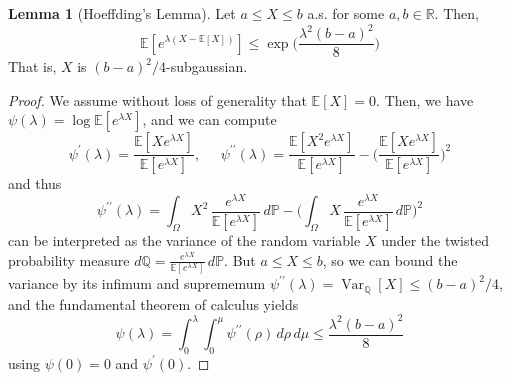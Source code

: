 \documentclass{article}
\DeclareMathOperator{\Var}{Var}
\theoremstyle{definition}
\newtheorem{lemma}[theorem]{Lemma}
\theoremstyle{remark}
\theoremstyle{definition}
\begin{document}
  \begin{lemma}[Hoeffding's Lemma]
  Let $a \leq X \leq b$ a.s. for some $a, b \in \mathbb{R}$. Then, 
  \[\mathbb{E}[e^{\lambda(X - \mathbb{E}[X])}] \leq \exp \bigg( \frac{\lambda^2 (b - a)^2}{8} \bigg)\]
  That is, $X$ is $(b-a)^2 /4$-subgaussian. 
  \end{lemma}
  \begin{proof}
  We assume without loss of generality that $\mathbb{E}[X] = 0$. Then, we have $\psi(\lambda) = \log \mathbb{E}[ e^{\lambda X}]$, and we can compute 
  \[\psi^\prime (\lambda) = \frac{\mathbb{E}[X e^{\lambda X}]}{\mathbb{E}[e^{\lambda X}]}, \;\;\;\;\; \psi^{\prime\prime} (\lambda) = \frac{\mathbb{E}[X^2 e^{\lambda X}]}{\mathbb{E}[e^{\lambda X}]} - \bigg( \frac{\mathbb{E}[X e^{\lambda X}]}{\mathbb{E}[e^{\lambda X}]} \bigg)^2\]
  and thus 
  \[\psi^{\prime\prime} (\lambda) = \int_\Omega X^2 \, \frac{e^{\lambda X}}{\mathbb{E}[e^{\lambda X}]} \,d\mathbb{P} - \bigg( \int_\Omega X \, \frac{e^{\lambda X}}{\mathbb{E}[e^{\lambda X}]} \,d\mathbb{P} \bigg)^2 \] 
  can be interpreted as the variance of the random variable $X$ under the twisted probability measure $d\mathbb{Q} = \frac{e^{\lambda X}}{\mathbb{E}[e^{\lambda X}]} \,d\mathbb{P}$. But $a \leq X \leq b$, so we can bound the variance by its infimum and suprememum $\psi^{\prime\prime} (\lambda) = \Var_\mathbb{Q} [X] \leq (b-a)^2 / 4$, and the fundamental theorem of calculus yields 
  \[\psi(\lambda) = \int_0^\lambda \int_0^\mu \psi^{\prime\prime} (\rho) \, d\rho \, d\mu \leq \frac{\lambda^2 (b - a)^2}{8}\]
  using $\psi(0) = 0$ and $\psi^\prime (0)$. 
  \end{proof}
\end{document}
